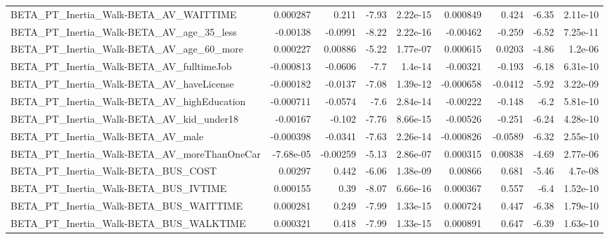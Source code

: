 \begin{tabular}{lrrrrrrrr}
BETA\_PT\_Inertia\_Walk-BETA\_AV\_WAITTIME              &    0.000287 &        0.211 &    -7.93 & 2.22e-15 &   0.000849 &       0.424 &        -6.35 &      2.11e-10 \\
BETA\_PT\_Inertia\_Walk-BETA\_AV\_age\_35\_less           &    -0.00138 &      -0.0991 &    -8.22 & 2.22e-16 &   -0.00462 &      -0.259 &        -6.52 &      7.25e-11 \\
BETA\_PT\_Inertia\_Walk-BETA\_AV\_age\_60\_more           &    0.000227 &      0.00886 &    -5.22 & 1.77e-07 &   0.000615 &      0.0203 &        -4.86 &       1.2e-06 \\
BETA\_PT\_Inertia\_Walk-BETA\_AV\_fulltimeJob           &   -0.000813 &      -0.0606 &     -7.7 &  1.4e-14 &   -0.00321 &      -0.193 &        -6.18 &      6.31e-10 \\
BETA\_PT\_Inertia\_Walk-BETA\_AV\_haveLicense           &   -0.000182 &      -0.0137 &    -7.08 & 1.39e-12 &  -0.000658 &     -0.0412 &        -5.92 &      3.22e-09 \\
BETA\_PT\_Inertia\_Walk-BETA\_AV\_highEducation         &   -0.000711 &      -0.0574 &     -7.6 & 2.84e-14 &   -0.00222 &      -0.148 &         -6.2 &      5.81e-10 \\
BETA\_PT\_Inertia\_Walk-BETA\_AV\_kid\_under18           &    -0.00167 &       -0.102 &    -7.76 & 8.66e-15 &   -0.00526 &      -0.251 &        -6.24 &      4.28e-10 \\
BETA\_PT\_Inertia\_Walk-BETA\_AV\_male                  &   -0.000398 &      -0.0341 &    -7.63 & 2.26e-14 &  -0.000826 &     -0.0589 &        -6.32 &      2.55e-10 \\
BETA\_PT\_Inertia\_Walk-BETA\_AV\_moreThanOneCar        &   -7.68e-05 &     -0.00259 &    -5.13 & 2.86e-07 &   0.000315 &     0.00838 &        -4.69 &      2.77e-06 \\
BETA\_PT\_Inertia\_Walk-BETA\_BUS\_COST                 &     0.00297 &        0.442 &    -6.06 & 1.38e-09 &    0.00866 &       0.681 &        -5.46 &       4.7e-08 \\
BETA\_PT\_Inertia\_Walk-BETA\_BUS\_IVTIME               &    0.000155 &         0.39 &    -8.07 & 6.66e-16 &   0.000367 &       0.557 &         -6.4 &      1.52e-10 \\
BETA\_PT\_Inertia\_Walk-BETA\_BUS\_WAITTIME             &    0.000281 &        0.249 &    -7.99 & 1.33e-15 &   0.000724 &       0.447 &        -6.38 &      1.79e-10 \\
BETA\_PT\_Inertia\_Walk-BETA\_BUS\_WALKTIME             &    0.000321 &        0.418 &    -7.99 & 1.33e-15 &   0.000891 &       0.647 &        -6.39 &      1.63e-10 \\

\end{tabular}

